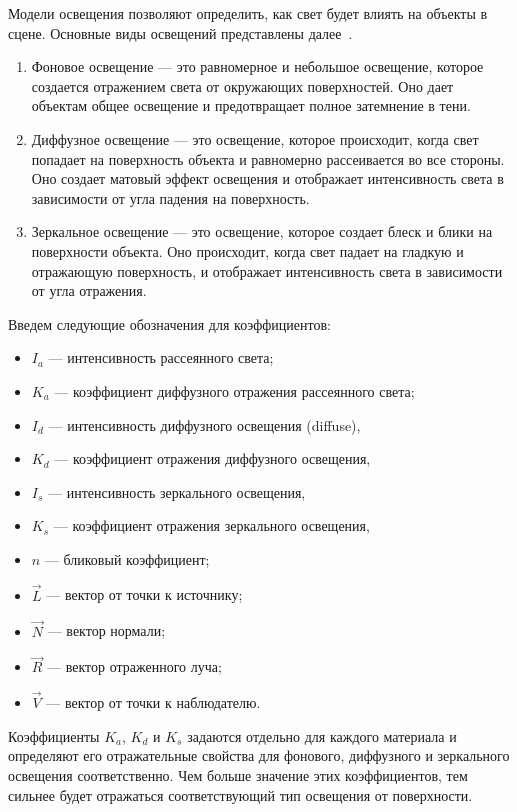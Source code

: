 Модели освещения позволяют определить, как свет будет влиять на объекты в сцене. 
Основные виды освещений представлены далее~\cite{roders}.
\begin{enumerate}[label=\arabic*)]
	\item Фоновое освещение --- это равномерное и небольшое освещение, которое создается отражением света от окружающих поверхностей. Оно дает объектам общее освещение и предотвращает полное затемнение в тени.
	\item Диффузное освещение --- это освещение, которое происходит, когда свет попадает на поверхность объекта и равномерно рассеивается во все стороны. Оно создает матовый эффект освещения и отображает интенсивность света в зависимости от угла падения на поверхность.
	\item Зеркальное освещение --- это освещение, которое создает блеск и блики на поверхности объекта. Оно происходит, когда свет падает на гладкую и отражающую поверхность, и отображает интенсивность света в зависимости от угла отражения.
\end{enumerate}

Введем следующие обозначения для коэффициентов:
\begin{itemize}
	\item $I_a$ --- интенсивность рассеянного света;
	\item $K_a$ --- коэффициент диффузного отражения рассеянного света;
	\item $I_d$ --- интенсивность диффузного освещения (diffuse),
	\item $K_d$ --- коэффициент отражения диффузного освещения,
	\item $I_s$ --- интенсивность зеркального освещения,
	\item $K_s$ --- коэффициент отражения зеркального освещения,
	\item $n$ --- бликовый коэффициент;
	\item $\vec{L}$ --- вектор от точки к источнику;
	\item $\vec{N}$ --- вектор нормали;
	\item $\vec{R}$ --- вектор отраженного луча;
	\item $\vec{V}$ --- вектор от точки к наблюдателю.
	
\end{itemize}

Коэффициенты $K_a$, $K_d$ и $K_s$ задаются отдельно для каждого материала и определяют его отражательные свойства для фонового, диффузного и зеркального освещения соответственно. Чем больше значение этих коэффициентов, тем сильнее будет отражаться соответствующий тип освещения от поверхности.

